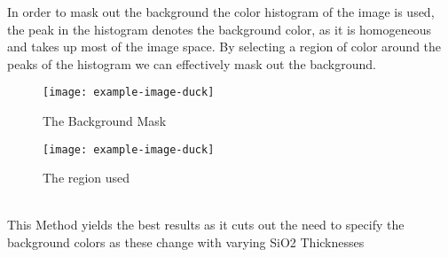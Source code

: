 In order to mask out the background the color histogram of the image is used, the peak in the histogram denotes the background color, as it is homogeneous and takes up most of the image space.
By selecting a region of color around the peaks of the histogram we can effectively mask out the background.\\
\begin{figure}[h]
\centering
\begin{minipage}{.45\textwidth}
  \centering
  \texttt{[image: example-image-duck]}
  \caption{The Background Mask}
\end{minipage}
\begin{minipage}{.45\textwidth}
  \centering
  \texttt{[image: example-image-duck]}
    \caption{The region used}
\end{minipage}
\end{figure}
\\
This Method yields the best results as it cuts out the need to specify the background colors as these change with varying SiO2 Thicknesses